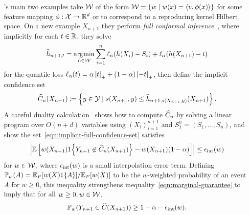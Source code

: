 \documentclass{article}
\newcommand{\loss}{\ell}
\newcommand{\scorefunc}{s}
\newcommand{\scoreval}{\scorefunc}
\newcommand{\scorerv}{S}
\begin{document}
\citeauthor{GibbsChCa25}'s main two examples take $\mathcal{W}$
of the form $\mathcal{W} = \{w \mid w(x) = \langle v,
\phi(x)\rangle\}$ for some feature mapping $\phi : \mathcal{X} \to \mathbb{R}^d$ or
to correspond to a reproducing kernel Hilbert space.
%
On a new example $X_{n + 1}$ they perform
\emph{full conformal inference}~\cite{VovkGaSh05},
where implicitly for each $t \in \mathbb{R}$, they solve
\begin{equation*}
  \what{h}_{n+1,t}
  = \argmin_{h \in \mc{W}}
  \sum_{i = 1}^n \loss_\alpha(h(X_i) - \scorerv_i)
  + \loss_\alpha(h(X_{n+1}) - t)
\end{equation*}
for the quantile loss $\loss_\alpha(t) = \alpha \hinge{t}
+ (1 - \alpha) \hinge{-t}$,
then define the implicit confidence set
\begin{equation}
  \what{C}_{n}(X_{n+1}) \defeq \left\{y \in \mc{Y}
  \mid \scoreval(X_{n + 1}, y) \le \what{h}_{n + 1, \scoreval(X_{n + 1},
    y)}(X_{n + 1}) \right\}.
  \label{eqn:implicit-full-confidence-set}
\end{equation}
A careful duality calculation~\cite[Sec.~4]{GibbsChCa25}
shows how to compute $\widehat{C}_n$ by solving a linear program
over $O(n + d)$ variables using $(X_i)_{i = 1}^{n + 1}$
and $\scorerv_1^n = (\scorerv_1, \ldots, \scorerv_n)$,
and \citeauthor{GibbsChCa25}
show the set~\eqref{eqn:implicit-full-confidence-set}
satisfies
\begin{equation*}
  \left|\mathbb{E}\left[w(X_{n+1})1\!\left\{
      Y_{n + 1} \not \in \widehat{C}_n(X_{n+1})\right\}
    - w(X_{n + 1}) (1 - \alpha)\right]\right|
  \le \epsilon_{\textup{int}}(w)
\end{equation*}
for $w \in \mathcal{W}$, where $\epsilon_{\textup{int}}(w)$ is a small
interpolation error term.
%
Defining $\mathbb{P}_w(A) = \mathbb{E}_P[w(X)
  1\!\left\{A\right\}] / \mathbb{E}_P[w(X)]$ to be the $w$-weighted probability of an event
$A$ for $w \ge 0$, this inequality strengthens
inequality~\eqref{eqn:marginal-guarantee} to imply that
for all $w \ge 0, w \in \mathcal{W}$,
\begin{equation}
  \label{eqn:cherian-gibbs-guarantee}
  \mathbb{P}_w(Y_{n + 1} \in \widehat{C}(X_{n + 1})) \ge 1 - \alpha
  - \epsilon_{\textup{int}}(w).
\end{equation}
\end{document}
